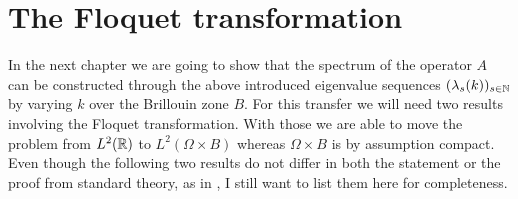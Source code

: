 \chapter{The Floquet transformation}

In the next chapter we are going to show that the spectrum of the operator $A$ can be constructed through the above introduced eigenvalue sequences $(\lambda_{s}(k))_{s \in \mathbb{N}}$ by varying $k$ over the Brillouin zone $B$. For this transfer we will need two results involving the Floquet transformation. With those we are able to move the problem from $L^{2}(\mathbb{R})$ to $L^{2}(\Omega \times B)$ whereas $\Omega \times B$ is by assumption compact. Even though the following two results do not differ in both the statement or the proof from standard theory, as in \cite[Chap. 3]{Plum10}, I still want to list them here for completeness.

